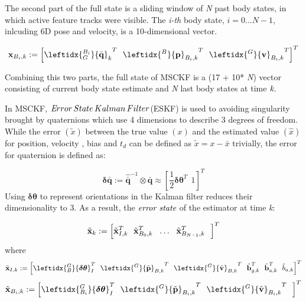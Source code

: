 \documentclass[a4paper, 10pt, conference]{ieeeconf}      %
\begin{document}
The second part of the full state is a sliding window of \emph N past body states, in which active feature tracks were visible. The \emph {i-th }body state, $ i = 0...N-1 $, inlcuding 6D pose and velocity, is a 10-dimensional vector. 
 
\begin {equation}
\textbf x_{B_i,k} :=\left[  {\leftidx{_{G}^{B_i}}{\bar{\textbf q}}_k}^{ T} \ \
{\leftidx{^B}{\textbf p}_{B_i,k}}^T \ \
{\leftidx{^G}{\textbf v}_{B_i,k}}^T
\right]^T
\end{equation}


Combining this two parts, the full state of MSCKF is a (17 + 10* \emph N)  vector consisting of  current body state estimate and \emph N last body states at time $  \emph k $. 

In MSCKF,  $ \emph Error \, State \, Kalman \, Filter$(ESKF)\cite{trawny2005indirect} is used to avoiding singularity brought by quaternions which use 4 dimensions to describe 3 degrees of freedom. While the error $ \left( \tilde x \right) $ between the true value $ \left(  x \right) $ and the estimated value $ \left( \hat x \right) $ for position, velocity , bias and $ t_d $ can be defined as $ \tilde x  = x - \bar x $  trivially, the error for quaternion is defined as:

\begin {equation}
\bm { \delta {\bar q}} := \bm{\hat{\bar q}}^{-1} \otimes \bm {  {\bar q}} \approx \left[\frac{1}{2}{ \bm {\delta \theta}}^T  \ \ 1\right]^T
\end{equation}
Using $  \bm {\delta \theta} $ to represent orientations
in the Kalman filter reduces their dimensionality to 3. As a result, the $\emph {error state} $ of the estimator  at time \emph k:

\begin {equation}
\tilde {\textbf x}_k :=\left[  {{\tilde{\textbf x}}_{I,k}}^{ T} \ \
{{\tilde{\textbf x}}_{B_0,k}}^{ T}  \ \
\ldots \ \
{{\tilde{\textbf x}}_{B_{N-1},k}}^{ T}  \ \
\right]^T
\end{equation}
where
\begin {equation}
\tilde{\textbf x}_{I,k} :=\left[  \leftidx{_B^G} { \bm {\delta \theta}}_{I}^T \ \
{\leftidx{^G}{\tilde {\textbf p}}_{B,k}}^T \ \
{\leftidx{^G}{\tilde {\textbf v}}_{B,k}}^T \ \
\tilde {\textbf  b}_{g,k}^T\ \
\tilde {\textbf b}_{a,k}^T \ \ 
\tilde {b}_{a,k}
\right]^T
\end{equation}
\begin {equation}
\tilde{\textbf x}_{B_i,k} :=\left[  \leftidx{_{B_i}^G} { \bm {\delta \theta}}_{I}^T \ \
{\leftidx{^G}{\tilde {\textbf p}}_{B_i,k}}^T \ \
{\leftidx{^G}{\tilde {\textbf v}}_{B_i,k}}^T \ \
\right]^T
\end{equation}
\end{document}
